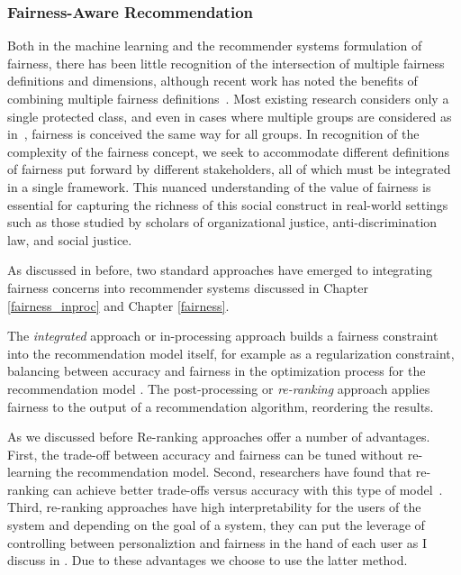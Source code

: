 \subsubsection{Fairness-Aware Recommendation}

Both in the machine learning and the recommender systems formulation of fairness, there has been little recognition of the intersection of multiple fairness definitions and dimensions, although recent work has noted the benefits of combining multiple fairness definitions~\cite{beutel2019fairness}. Most existing research considers only a single protected class, and even in cases where multiple groups are considered as in~\cite{buolamwini2018gender,hebert2018multicalibration,kearns2017preventing,zhu2018fairness}, fairness is conceived the same way for all groups. In recognition of the complexity of the fairness concept, we seek to accommodate different definitions of fairness put forward by different stakeholders, all of which must be integrated in a single framework. This nuanced understanding of the value of fairness is essential for capturing the richness of this social construct in real-world settings such as those studied by scholars of organizational justice, anti-discrimination law, and social justice.

As discussed in before, two standard approaches have emerged to integrating fairness concerns into recommender systems discussed in Chapter \ref{fairness_inproc} and Chapter \ref{fairness}.

The \textit{integrated} approach or in-processing approach builds a fairness constraint into the recommendation model itself, for example as a regularization constraint, balancing between accuracy and fairness in the optimization process for the recommendation model \cite{kamishima2012fairness,yao2017beyond}. The post-processing or \textit{re-ranking} approach applies fairness to the output of a recommendation algorithm, reordering the results. 

As we discussed before Re-ranking approaches offer a number of advantages. First, the trade-off between accuracy and fairness can be tuned without re-learning the recommendation model. Second, researchers have found that re-ranking can achieve better trade-offs versus accuracy with this type of model~\cite{pmlr-v81-ekstrand18b,abdollahpouri2019managing,liu2019personalized}. Third, re-ranking approaches have high interpretability for the users of the system and depending on the goal of a system, they can put the leverage of controlling between personaliztion and fairness in the hand of each user as I discuss in \cite{Sonboli2021transparency}. Due to these advantages we choose to use the latter method.

